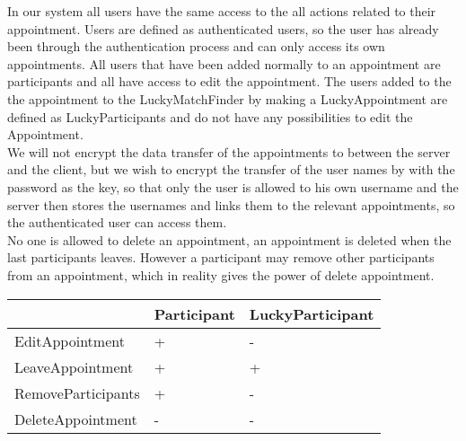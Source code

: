 In our system all users have the same access to the all actions related to their appointment. Users are defined as authenticated users, so the user has already been through the authentication process and can only access its own appointments. All users that have been added normally to an appointment are participants and all have access to edit the appointment. The users added to the the appointment to the LuckyMatchFinder by making a LuckyAppointment are defined as LuckyParticipants and do not have any possibilities to edit the Appointment.\\

We will not encrypt the data transfer of the appointments to between the server and the client, but we wish to encrypt the transfer of the user names by with the password as the key, so that only the user is allowed to his own username and the server then stores the usernames and links them to the relevant appointments, so the authenticated user can access them. \\

No one is allowed to delete an appointment, an appointment is deleted when the last participants leaves. 
However a participant may remove other participants from an appointment, which in reality gives the power of delete appointment.

{\tabulinesep=1.2mm
\begin{tabu}{ | p{3cm} | p{6cm} | p{6cm} |}
    \hline
     	 			        & 		Participant         &		LuckyParticipant \\ \hline
    EditAppointment         &       +					&		-          \\\hline
    LeaveAppointment        &       +					&		+      \\ \hline
    RemoveParticipants		&		+					&		- 		\\\hline
    DeleteAppointment       &       -					&		-        \\  \hline
\end{tabu}
}